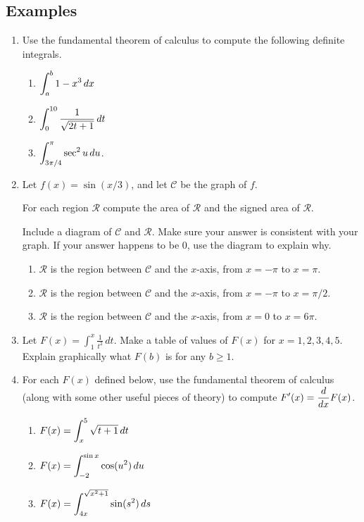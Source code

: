 \documentclass[11pt]{article}
\theoremstyle{definition}
\theoremstyle{named}
\numberwithin{myalgctr}{section}
\begin{document}
\subsection*{Examples}
\begin{enumerate}
  \item Use the fundamental theorem of calculus to compute the following definite integrals.
  \begin{enumerate}
    \item $\displaystyle\int_a^b 1-x^3\, dx$
    \item $\displaystyle\int_0^{10} \frac{1}{\sqrt{2t+1}}\, dt$
    \item $\displaystyle\int_{3\pi/4}^{\pi}\sec^2 u\, du$.
  \end{enumerate}
  \item Let $f(x)=\sin(x/3)$, and let $\mathcal{C}$ be the graph of $f$.

  For each region $\mathcal{R}$ compute the area of $\mathcal{R}$ and the signed area of $\mathcal{R}$.

  Include a diagram of $\mathcal{C}$ and $\mathcal{R}$. Make sure your answer is consistent with your graph. If your answer happens to be 0, use the diagram to explain why.
  \begin{enumerate}
    \item $\mathcal{R}$ is the region between $\mathcal{C}$ and the $x$-axis, from $x=-\pi$ to $x=\pi$.
    \item $\mathcal{R}$ is the region between $\mathcal{C}$ and the $x$-axis, from $x=-\pi$ to $x=\pi/2$.
    \item $\mathcal{R}$ is the region between $\mathcal{C}$ and the $x$-axis, from $x=0$ to $x=6\pi$.
  \end{enumerate}
  \item Let $F(x)=\int_1^x \frac{1}{t^2}\, dt$. Make a table of values of $F(x)$ for $x=1, 2, 3, 4, 5$. Explain graphically what $F(b)$ is for any $b\geq 1$.
  \item For each $F(x)$ defined below, use the fundamental theorem of calculus (along with some other useful pieces of theory) to compute $\displaystyle F'(x)=\frac{d}{dx}F(x)$.
  \begin{enumerate}
    \item $\displaystyle F(x)=\int_{x}^5 \sqrt{t+1}\, dt $
    \item $\displaystyle F(x)=\int_{-2}^{\sin x}\cos(u^2) \, du$
    \item $\displaystyle F(x)=\int_{4x}^{\sqrt{x^2+1}}\sin(s^2)\, ds$

  \end{enumerate}
\end{enumerate}
\end{document}
